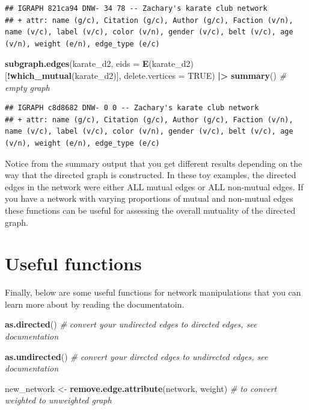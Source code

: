 \documentclass[
]{book}
\newenvironment{Shaded}{\begin{snugshade}}{\end{snugshade}}
\newcommand{\AttributeTok}[1]{\textcolor[rgb]{0.13,0.29,0.53}{#1}}
\newcommand{\CommentTok}[1]{\textcolor[rgb]{0.56,0.35,0.01}{\textit{#1}}}
\newcommand{\ConstantTok}[1]{\textcolor[rgb]{0.56,0.35,0.01}{#1}}
\newcommand{\FunctionTok}[1]{\textcolor[rgb]{0.13,0.29,0.53}{\textbf{#1}}}
\newcommand{\NormalTok}[1]{#1}
\newcommand{\OtherTok}[1]{\textcolor[rgb]{0.56,0.35,0.01}{#1}}
\newcommand{\SpecialCharTok}[1]{\textcolor[rgb]{0.81,0.36,0.00}{\textbf{#1}}}
\newcommand{\StringTok}[1]{\textcolor[rgb]{0.31,0.60,0.02}{#1}}
\begin{document}
\begin{verbatim}
## IGRAPH 821ca94 DNW- 34 78 -- Zachary's karate club network
## + attr: name (g/c), Citation (g/c), Author (g/c), Faction (v/n), name (v/c), label (v/c), color (v/n), gender (v/c), belt (v/c), age (v/n), weight (e/n), edge_type (e/c)
\end{verbatim}

\begin{Shaded}
\begin{Highlighting}[]
\FunctionTok{subgraph.edges}\NormalTok{(karate\_d2, }\AttributeTok{eids =} \FunctionTok{E}\NormalTok{(karate\_d2)[}\SpecialCharTok{!}\FunctionTok{which\_mutual}\NormalTok{(karate\_d2)], }\AttributeTok{delete.vertices =} \ConstantTok{TRUE}\NormalTok{) }\SpecialCharTok{|\textgreater{}} 
  \FunctionTok{summary}\NormalTok{() }\CommentTok{\# empty graph}
\end{Highlighting}
\end{Shaded}

\begin{verbatim}
## IGRAPH c8d8682 DNW- 0 0 -- Zachary's karate club network
## + attr: name (g/c), Citation (g/c), Author (g/c), Faction (v/n), name (v/c), label (v/c), color (v/n), gender (v/c), belt (v/c), age (v/n), weight (e/n), edge_type (e/c)
\end{verbatim}

Notice from the summary output that you get different results depending on the way that the directed graph is constructed. In these toy examples, the directed edges in the network were either ALL mutual edges or ALL non-mutual edges. If you have a network with varying proportions of mutual and non-mutual edges these functions can be useful for assessing the overall mutuality of the directed graph.

\section{Useful functions}\label{useful-functions}

Finally, below are some useful functions for network manipulations that you can learn more about by reading the documentatoin.

\begin{Shaded}
\begin{Highlighting}[]
\FunctionTok{as.directed}\NormalTok{() }\CommentTok{\# convert your undirected edges to directed edges, see documentation }

\FunctionTok{as.undirected}\NormalTok{() }\CommentTok{\# convert your directed edges to undirected edges, see documentation }

\NormalTok{new\_network }\OtherTok{\textless{}{-}} \FunctionTok{remove.edge.attribute}\NormalTok{(network, }\StringTok{\textquotesingle{}weight\textquotesingle{}}\NormalTok{) }\CommentTok{\# to convert weighted to unweighted graph }
\end{Highlighting}
\end{Shaded}
\end{document}
